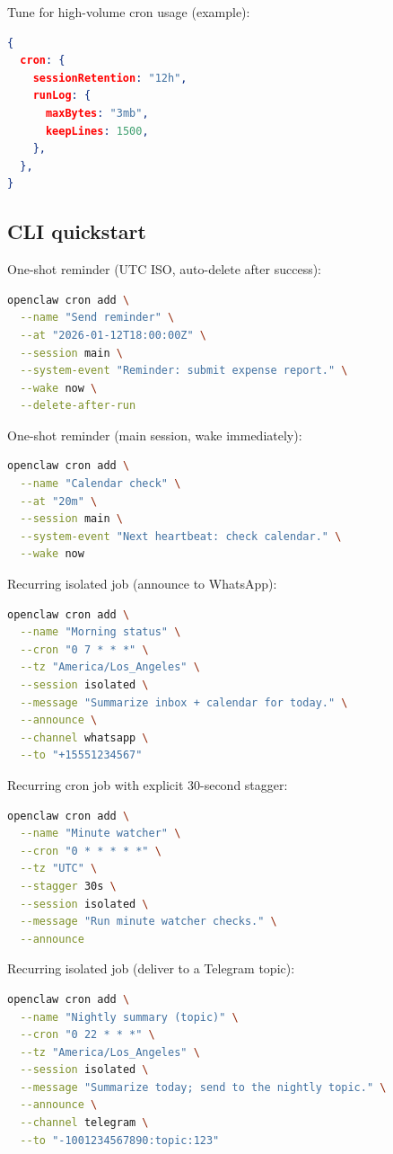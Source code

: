Tune for high-volume cron usage (example):

\begin{lstlisting}[language=json]
{
  cron: {
    sessionRetention: "12h",
    runLog: {
      maxBytes: "3mb",
      keepLines: 1500,
    },
  },
}
\end{lstlisting}


\subsection{CLI quickstart}


One-shot reminder (UTC ISO, auto-delete after success):

\begin{lstlisting}[language=bash]
openclaw cron add \
  --name "Send reminder" \
  --at "2026-01-12T18:00:00Z" \
  --session main \
  --system-event "Reminder: submit expense report." \
  --wake now \
  --delete-after-run
\end{lstlisting}


One-shot reminder (main session, wake immediately):

\begin{lstlisting}[language=bash]
openclaw cron add \
  --name "Calendar check" \
  --at "20m" \
  --session main \
  --system-event "Next heartbeat: check calendar." \
  --wake now
\end{lstlisting}


Recurring isolated job (announce to WhatsApp):

\begin{lstlisting}[language=bash]
openclaw cron add \
  --name "Morning status" \
  --cron "0 7 * * *" \
  --tz "America/Los_Angeles" \
  --session isolated \
  --message "Summarize inbox + calendar for today." \
  --announce \
  --channel whatsapp \
  --to "+15551234567"
\end{lstlisting}


Recurring cron job with explicit 30-second stagger:

\begin{lstlisting}[language=bash]
openclaw cron add \
  --name "Minute watcher" \
  --cron "0 * * * * *" \
  --tz "UTC" \
  --stagger 30s \
  --session isolated \
  --message "Run minute watcher checks." \
  --announce
\end{lstlisting}


Recurring isolated job (deliver to a Telegram topic):

\begin{lstlisting}[language=bash]
openclaw cron add \
  --name "Nightly summary (topic)" \
  --cron "0 22 * * *" \
  --tz "America/Los_Angeles" \
  --session isolated \
  --message "Summarize today; send to the nightly topic." \
  --announce \
  --channel telegram \
  --to "-1001234567890:topic:123"
\end{lstlisting}


